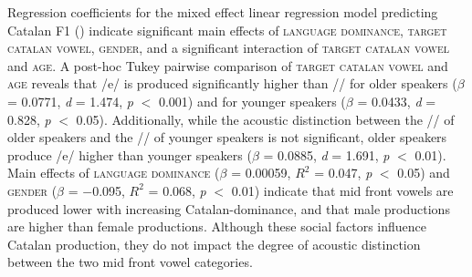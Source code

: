 \documentclass[output=paper,colorlinks,citecolor=brown,draftmode]{langscibook}
\begin{document}
    Regression coefficients for the mixed effect linear regression model predicting Catalan F1 () indicate significant main effects of \textsc{language dominance}, \textsc{target catalan vowel}, \textsc{gender}, and a significant interaction of \textsc{target catalan vowel} and \textsc{age}. A post-hoc Tukey pairwise comparison of \textsc{target catalan vowel} and \textsc{age} reveals that /e/ is produced significantly higher than /\textepsilon/ for older speakers ($\beta$ = 0.0771, \emph{d} = 1.474, \emph{p} $<$ 0.001) and for younger speakers ($\beta$ = 0.0433, \emph{d} = 0.828, \emph{p} $<$ 0.05). Additionally, while the acoustic distinction between the /\textepsilon/ of older speakers and the /\textepsilon/ of younger speakers is not significant, older speakers produce /e/ higher than younger speakers ($\beta$ = 0.0885, \emph{d} = 1.691, \emph{p} $<$ 0.01). Main effects of \textsc{language dominance} ($\beta$ = 0.00059, $R^{2}$ = 0.047, \emph{p} $<$ 0.05) and \textsc{gender} ($\beta$ = $-$0.095, $R^{2}$ = 0.068, \emph{p} $<$ 0.01) indicate that mid front vowels are produced lower with increasing Catalan-dominance, and that male productions are higher than female productions. Although these social factors influence Catalan production, they do not impact the degree of acoustic distinction between the two mid front vowel categories.
\end{document}
